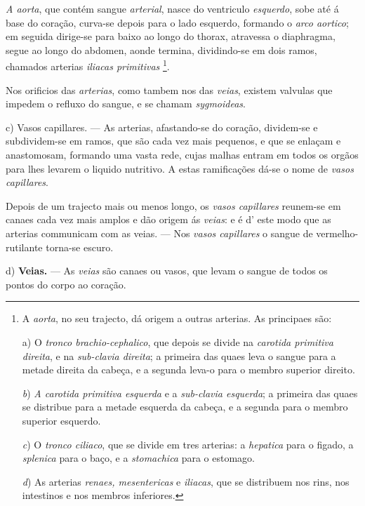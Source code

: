 \emph{A aorta}, que contém sangue \emph{arterial}, nasce do ventriculo \emph{esquerdo}, sobe até á base do coração, curva-se depois para o lado esquerdo, formando o \emph{arco aortico}; em seguida dirige-se para baixo ao longo do thorax, atravessa o diaphragma, segue ao longo do abdomen, aonde termina, dividindo-se em dois ramos, chamados arterias \emph{iliacas primitivas} \footnote{A \emph{aorta}, no seu trajecto, dá origem a outras arterias. As principaes são:\par a) O \emph{tronco brachio-cephalico}, que depois se divide na \emph{carotida primitiva direita}, e na \emph{sub-clavia direita}; a primeira das quaes leva o sangue para a metade direita da cabeça, e a segunda leva-o para o membro superior direito.\par \emph{b}) \emph{A carotida primitiva esquerda} e a \emph{sub-clavia esquerda}; a primeira das quaes se distribue para a metade esquerda da cabeça, e a segunda para o membro superior esquerdo.\par \emph{c}) O \emph{tronco ciliaco}, que se divide em tres arterias: a \emph{hepatica} para o figado, a \emph{splenica} para o baço, e a \emph{stomachica} para o estomago.\par \emph{d}) As arterias \emph{renaes, mesentericas} e \emph{iliacas}, que se distribuem nos rins, nos intestinos e nos membros inferiores.}.

Nos orificios das \emph{arterias}, como tambem nos das \emph{veias}, existem valvulas que impedem o refluxo do sangue, e se chamam \emph{sygmoideas}.

c) Vasos capillares. --- As arterias, afastando-se do coração, dividem-se e subdividem-se em ramos, que são cada vez mais pequenos, e que se enlaçam e anastomosam, formando uma vasta rede, cujas malhas entram em todos os orgãos para lhes levarem o liquido nutritivo. A estas ramificações dá-se o nome de \emph{vasos capillares}.

Depois de um trajecto mais ou menos longo, os \emph{vasos capillares} reunem-se em canaes cada vez mais amplos e dão   origem ás \emph{veias}: e é d' este modo que as arterias communicam com as veias. --- Nos \emph{vasos capillares} o sangue de vermelho-rutilante torna-se escuro.

d) \textbf{Veias.} --- As \emph{veias} são canaes ou vasos, que levam o sangue de todos os pontos do corpo ao coração.

